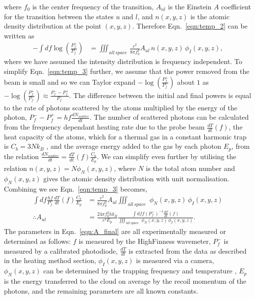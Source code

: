 \documentclass[%
 amsmath,amssymb,
aps,
]{revtex4-2}
\begin{document}
where \(f_0\) is the center frequency of the transition, \(A_{ul}\) is the Einstein \(A\) coefficient for the transition between the states \(u\) and \(l\), and \(n(x,y,z)\) is the atomic density distribution at the point \((x,y,z)\). Therefore Eqn.~\ref{eqn:temp_2} can be written as
\begin{align}
   -\int df \log\left( \frac{P_{f}^+}{P_{f}^-} \right) &= \iiint_{all\, space} \, \frac{c^2}{8 \pi f_0^2} A_{ul} \, n(x,y,z) \, \phi_I(x,y,z) \label{eqn:temp_3},
\end{align}
where we have assumed the intensity distribution is frequency independent. To simplify Eqn.~\ref{eqn:temp_3} further, we assume that the power removed from the beam is small and so we can Taylor expand \(-\log\left( \frac{P_{f}^+}{P_{f}^-} \right)\) about \(1\) as \(-\log\left( \frac{P_{f}^+}{P_{f}^-} \right) \approx \frac{P_{f}^--P_{f}^+}{P_{f}^-}\). The difference between the initial and final powers is equal to the rate of photons scattered by the atoms multiplied by the energy of the photon, \(P_{f}^--P_{f}^+= h f \frac{dN_{scatter}}{dt}\). The number of scattered photons can be calculated from the frequency dependant heating rate due to the probe beam \(\frac{dT}{dt}(f)\), the heat capacity of the atoms, which for a thermal gas in a constant harmonic trap is \(C_b = 3 N k_B\) \cite{doi:10.1119/1.3417868}, and the average energy added to the gas by each photon \(E_p\), from the relation \(\frac{dN_{scatter}}{dt} = \frac{dT}{dt}(f) \frac{C_b}{E_p}\). We can simplify even further by utilising the relation \(n(x,y,z) = N \phi_N(x,y,z)\), where \(N\) is the total atom number and \(\phi_N(x,y,z)\) gives the atomic density distribution with unit normalisation. Combining we see Eqn.~\ref{eqn:temp_3} becomes,
\begin{align}
    \int df \frac{hf}{P_{f}^-} \frac{dT}{dt}(f) \frac{C_b}{E_p} &= \frac{c^2}{8 \pi f_0^2} A_{ul} \iiint_{all\, space} \,  \, \phi_N(x,y,z) \, \phi_I(x,y,z) \\
    \therefore A_{ul} &= \frac{24 \pi f_0^2 h k_B}{c^2 E_p} \frac{ \int df f \left(P_{f}^-\right)^{-1} \frac{dT}{dt}(f)}{\iiint_{all\, space} \,  \, \phi_N(x,y,z) \, \phi_I(x,y,z)}. \label{eqn:A_final}
\end{align}
The parameters in Eqn.~\ref{eqn:A_final} are all experimentally measured or determined as follows: \(f\) is measured by the HighFinness wavemeter, \(P_{f}^-\) is measured by a calibrated photodiode, \(\frac{dT}{dt}\) is extracted from the data as described in the heating method section, \(\phi_I(x,y,z)\) is measured via a camera, \(\phi_N(x,y,z)\) can be determined by the trapping frequency and temperature \cite{doi:10.1119/1.3417868}, \(E_p\) is the energy transferred to the cloud on average by the recoil momentum of the photons, and the remaining parameters are all known constants.
\end{document}
